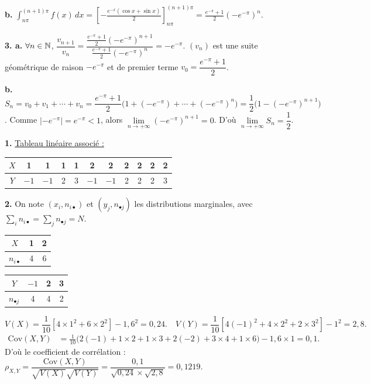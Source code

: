 \documentclass[11pt]{article}
\begin{document}
\textbf{b.} $\displaystyle\int_{n\pi}^{(n+1)\pi} f(x)\,dx = \left[-\frac{e^{-x}(\cos x + \sin x)}{2}\right]_{n\pi}^{(n+1)\pi} = \frac{e^{-\pi} + 1}{2}(-e^{-\pi})^n$.

\textbf{3. a.} $\forall n \in \mathbb{N}$, $\dfrac{v_{n+1}}{v_n} = \dfrac{\frac{e^{-\pi} + 1}{2}(-e^{-\pi})^{n+1}}{\frac{e^{-\pi} + 1}{2}(-e^{-\pi})^n} = -e^{-\pi}$. $(v_n)$ est une suite géométrique de raison $-e^{-\pi}$ et de premier terme $v_0 = \dfrac{e^{-\pi} + 1}{2}$.

\textbf{b.} $S_n = v_0 + v_1 + \cdots + v_n = \dfrac{e^{-\pi} + 1}{2}\big(1 + (-e^{-\pi}) + \cdots + (-e^{-\pi})^n\big) = \dfrac{1}{2}\big(1 - (-e^{-\pi})^{n+1}\big)$. Comme $|-e^{-\pi}| = e^{-\pi} < 1$, alors $\lim\limits_{n\to+\infty}(-e^{-\pi})^{n+1} = 0$. D'où $\lim\limits_{n\to+\infty} S_n = \dfrac{1}{2}$.


\textbf{1.} \underline{Tableau linéaire associé :}
\begin{center}\renewcommand{\arraystretch}{1.3}\setlength{\tabcolsep}{4pt}
\begin{tabular}{|c|*{10}{c|}}
\hline
$X$ & 1 & 1 & 1 & 1 & 2 & 2 & 2 & 2 & 2 & 2 \\
\hline
$Y$ & $-1$ & $-1$ & 2 & 3 & $-1$ & $-1$ & 2 & 2 & 2 & 3 \\
\hline
\end{tabular}
\end{center}

\textbf{2.} On note $(x_i, n_{i\bullet})$ et $(y_j, n_{\bullet j})$ les distributions marginales, avec $\sum_i n_{i\bullet} = \sum_j n_{\bullet j} = N$.
\begin{center}\renewcommand{\arraystretch}{1.3}
\begin{tabular}{|c|c|c|}\hline $X$ & 1 & 2 \\\hline $n_{i\bullet}$ & 4 & 6 \\\hline\end{tabular}
\qquad
\begin{tabular}{|c|c|c|c|}\hline $Y$ & $-1$ & 2 & 3 \\\hline $n_{\bullet j}$ & 4 & 4 & 2 \\\hline\end{tabular}
\end{center}
\[ V(X) = \frac{1}{10}\left[4 \times 1^2 + 6 \times 2^2\right] - 1{,}6^2 = 0{,}24. \quad V(Y) = \frac{1}{10}\left[4(-1)^2 + 4 \times 2^2 + 2 \times 3^2\right] - 1^2 = 2{,}8. \]
\begin{align*}
\mathrm{Cov}(X, Y) &= \frac{1}{10}\big(2(-1) + 1 \times 2 + 1 \times 3 + 2(-2) + 3 \times 4 + 1 \times 6\big) - 1{,}6 \times 1 = 0{,}1.
\end{align*}
D'où le coefficient de corrélation : $\rho_{X,Y} = \dfrac{\mathrm{Cov}(X, Y)}{\sqrt{V(X)}\sqrt{V(Y)}} = \dfrac{0{,}1}{\sqrt{0{,}24} \times \sqrt{2{,}8}} = 0{,}1219$.
\end{document}
